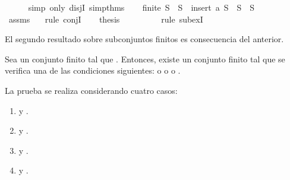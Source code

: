 \begin{isabellebody}
\ \ \ \ \isamarkupfalse%
\ {\isacharparenleft}simp\ only{\isacharcolon}\ disjI{}\ simp{\isacharunderscore}thms{\isacharparenright}\isanewline
\ \ \isamarkupfalse%
\ {\isachardoublequoteopen}finite\ S\ {\isasymand}\ {\isacharparenleft}S\ {\isacharequal}\ insert\ a\ S\ {\isasymor}\ S\ {\isacharequal}\ S{\isacharparenright}{\isachardoublequoteclose}\isanewline
\ \ \ \ \isamarkupfalse%
\ assms{\isacharparenleft}{}{\isacharparenright}\ {}\ \isamarkupfalse%
\ {\isacharparenleft}rule\ conjI{\isacharparenright}\isanewline
\ \ \isamarkupfalse%
\ {\isacharquery}thesis\ \isanewline
\ \ \ \ \isamarkupfalse%
\ {}\ \isamarkupfalse%
\ {\isacharparenleft}rule\ subexI{\isacharparenright}\isanewline
{}\isamarkupfalse%
%
\endisatagproof
{\isafoldproof}%
%
\isadelimproof
%
\endisadelimproof
%
\begin{isamarkuptext}%
El segundo resultado sobre subconjuntos finitos es consecuencia del anterior.

\begin{lema}
  Sea  un conjunto finito tal que . Entonces, existe un conjunto finito  
  tal que se verifica una de las condiciones siguientes:  o  o 
   o .
\end{lema}

\begin{demostracion}
  La prueba se realiza considerando cuatro casos:
  \begin{enumerate}
    \item {} y . 
    \item {} y . 
    \item {} y .
    \item {} y . 
  \end{enumerate}


\end{demostracion}
\end{isamarkuptext}
\end{isabellebody}
